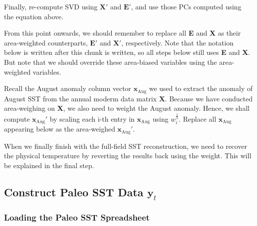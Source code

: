 \documentclass{article}
\begin{document}
Finally, re-compute SVD using $\textbf{X}'$ and $\textbf{E}'$, and use those PCs computed using the equation above.

From this point onwards, we should remember to replace all \textbf{E} and \textbf{X} as their area-weighted counterparts, $\textbf{E}'$ and $\textbf{X}'$, respectively.
Note that the notation below is written after this chunk is written, so all steps below still uses \textbf{E} and \textbf{X}.
But note that we should override these area-biased variables using the area-weighted variables.

Recall the August anomaly column vector $\textbf{x}_{\text{Aug}}$ we used to extract the anomaly of August SST from the annual moderm data matrix \textbf{X}.
Because we have conducted area-weighing on \textbf{X}, we also need to weight the August anomaly.
Hence, we shall compute $\textbf{x}_{\text{Aug}}'$ by scaling each i-th entry in $\textbf{x}_{\text{Aug}}$ using $w_i^{\frac{1}{2}}$.
Replace all $\textbf{x}_{\text{Aug}}$ appearing below as the area-weighed $\textbf{x}_{\text{Aug}}'$.

When we finally finish with the full-field SST reconstruction, we need to recover the physical temperature by reverting the results back using the weight.
This will be explained in the final step.


\subsection{Construct Paleo SST Data $\textbf{y}_t$}

\subsubsection{Loading the Paleo SST Spreadsheet}
\end{document}
